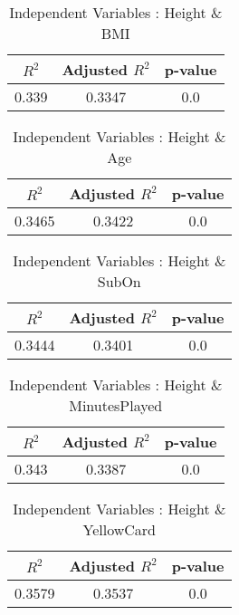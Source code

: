 \documentclass[12pt]{article}
\begin{document}
\hfill
\begin{minipage}{0.4\textwidth}
	\begin{table}[H]
		\centering
		\caption{Independent Variables : Height \& BMI}\label{table:1a}
		{\begin{tabular}{|c|c|c|}
				\hline
				$ R^2 $ & Adjusted $ R^2 $ & p-value \\
				\hline
				0.339 & 0.3347 & 0.0 \\
				\hline
			\end{tabular}
		}
	\end{table}
\end{minipage}
\hfill
\begin{minipage}{0.4\textwidth}
	\begin{table}[H]
		\centering
		\caption{Independent Variables : Height \& Age}\label{table:1a}
		{\begin{tabular}{|c|c|c|}
				\hline
				$ R^2 $ & Adjusted $ R^2 $ & p-value \\
				\hline
				0.3465 & 0.3422 & 0.0 \\
				\hline
			\end{tabular}
		}
	\end{table}
\end{minipage}
\hfill
\begin{minipage}{0.4\textwidth}
	\begin{table}[H]
		\centering
		\caption{Independent Variables : Height \& SubOn}\label{table:1a}
		{\begin{tabular}{|c|c|c|}
				\hline
				$ R^2 $ & Adjusted $ R^2 $ & p-value \\
				\hline
				0.3444 & 0.3401 & 0.0 \\
				\hline
			\end{tabular}
		}
	\end{table}
\end{minipage}
\hfill
\begin{minipage}{0.4\textwidth}
	\begin{table}[H]
		\centering
		\caption{Independent Variables : Height \& MinutesPlayed}\label{table:1a}
		{\begin{tabular}{|c|c|c|}
				\hline
				$ R^2 $ & Adjusted $ R^2 $ & p-value \\
				\hline
				0.343 & 0.3387 & 0.0 \\
				\hline
			\end{tabular}
		}
	\end{table}
\end{minipage}
\hfill
\begin{minipage}{0.4\textwidth}
	\begin{table}[H]
		\centering
		\caption{Independent Variables : Height \& YellowCard}\label{table:1a}
		{\begin{tabular}{|c|c|c|}
				\hline
				$ R^2 $ & Adjusted $ R^2 $ & p-value \\
				\hline
				0.3579 & 0.3537 & 0.0 \\
				\hline
			\end{tabular}
		}
	\end{table}
\end{minipage}
\end{document}
